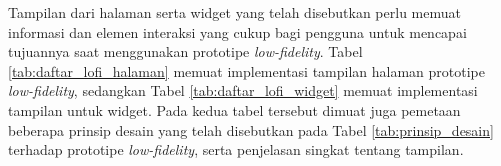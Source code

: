 Tampilan dari halaman serta widget yang telah disebutkan perlu memuat informasi dan elemen interaksi yang cukup bagi pengguna untuk mencapai tujuannya saat menggunakan prototipe \textit{low-fidelity}. Tabel \ref{tab:daftar_lofi_halaman} memuat implementasi tampilan halaman prototipe \textit{low-fidelity}, sedangkan Tabel \ref{tab:daftar_lofi_widget} memuat implementasi tampilan untuk widget. Pada kedua tabel tersebut dimuat juga pemetaan beberapa prinsip desain yang telah disebutkan pada Tabel \ref{tab:prinsip_desain} terhadap prototipe \textit{low-fidelity}, serta penjelasan singkat tentang tampilan.

\newpage


\newlength{\lofiwidth}
\setlength{\lofiwidth}{0.325\textwidth}

\newcommand{\lofi}[1]{\begin{center}\texttt{[image: \#1]}\end{center}}
\newcommand{\lofiwidget}[2]{\begin{center}\texttt{[image: \#2]}\end{center}}

